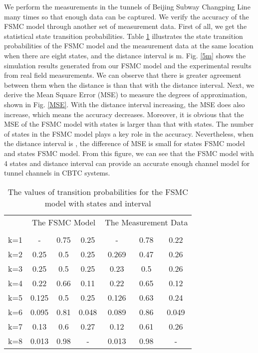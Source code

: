 \documentclass[conference]{IEEEtran}
\begin{document}
We perform the measurements in the  tunnels of Beijing Subway Changping Line many times so that enough data can be captured. We verify the accuracy of the FSMC model through another set of measurement data. First of all, we get the statistical state transition probabilities. Table \ref{STPM_8} illustrates the state transition probabilities of the FSMC model and the measurement data at the same location  when there are eight states, and the distance interval is m. Fig. \ref{5m} shows the simulation results generated from our FSMC model and the experimental results from real field measurements. We can observe that there is greater agreement between them when the distance is  than that with the  distance interval. Next, we derive the Mean Square Error (MSE) to measure the degrees of approximation, shown in Fig. \ref{MSE}. With the distance interval increasing, the MSE does also increase, which means the accuracy decreases. Moreover, it is obvious that the MSE of the FSMC model with  states is larger than that with  states. The number of states in the FSMC model plays a key role in the accuracy. Nevertheless, when the distance interval is , the difference of MSE is small for  states FSMC model and  states FSMC model. From this figure, we can see that the FSMC model with 4 states and  distance interval can provide an accurate enough channel model for tunnel channels in CBTC systems.

\begin{table}[tp]


\caption{The values of transition probabilities for the FSMC model with  states and  interval}
\label{STPM_8}
\begin{tabular}{|c|c|c|c|c|c|c|}
\hline
   &\multicolumn{3}{c}{The FSMC Model}\vline&\multicolumn{3}{c}{The Measurement Data}\vline\\ \cline{2-7}
   &&&&&&\\ \hline
k=1&-&0.75&0.25&-&0.78&0.22	\\\hline
k=2&0.25&0.5&0.25&0.269&0.47&0.26\\ \hline
k=3&0.25&0.5&0.25&0.23&0.5&0.26\\\hline
k=4&0.22&0.66&0.11&0.22&0.65&0.12\\\hline
k=5&0.125&0.5&0.25&0.126&0.63&0.24\\\hline
k=6&0.095&0.81&0.048&0.089&0.86&0.049\\\hline
k=7&0.13&0.6&0.27&0.12&0.61&0.26\\\hline
k=8&0.013&0.98&-&0.013&0.98&-\\\hline
\end{tabular}
\end{table}
\end{document}
